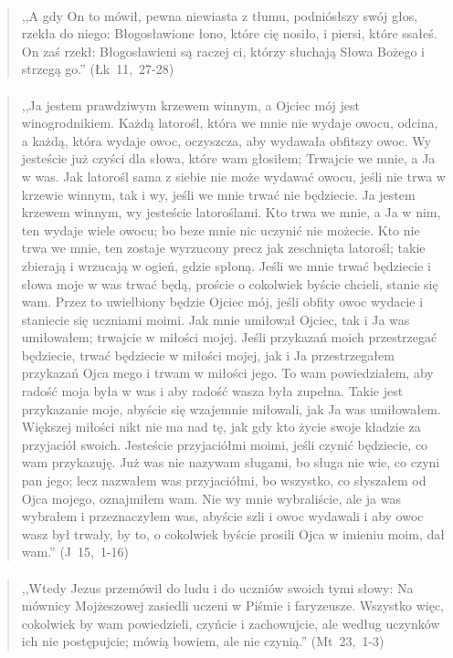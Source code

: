 \documentclass[10pt,a4paper,oneside]{article}
\begin{document}
\paragraph{}
\begin{quote}
,,A gdy On to mówił, pewna niewiasta z tłumu, podniósłszy swój głos, rzekła do niego: Błogosławione łono, które cię nosiło, i piersi, które ssałeś. On zaś rzekł: Błogosławieni są raczej ci, którzy słuchają Słowa Bożego i strzegą go.'' \mbox{(Łk 11, 27-28)}
\end{quote}
\paragraph{}
\begin{quote}
,,Ja jestem prawdziwym krzewem winnym, a Ojciec mój jest winogrodnikiem. Każdą latorośl, która we mnie nie wydaje owocu, odcina, a każdą, która wydaje owoc, oczyszcza, aby wydawała obfitszy owoc. Wy jesteście już czyści dla słowa, które wam głosiłem; Trwajcie we mnie, a Ja w was. Jak latorośl sama z siebie nie może wydawać owocu, jeśli nie trwa w krzewie winnym, tak i wy, jeśli we mnie trwać nie będziecie. Ja jestem krzewem winnym, wy jesteście latoroślami. Kto trwa we mnie, a Ja w nim, ten wydaje wiele owocu; bo beze mnie nic uczynić nie możecie. Kto nie trwa we mnie, ten zostaje wyrzucony precz jak zeschnięta latorośl; takie zbierają i wrzucają w ogień, gdzie spłoną. Jeśli we mnie trwać będziecie i słowa moje w was trwać będą, proście o cokolwiek byście chcieli, stanie się wam. Przez to uwielbiony będzie Ojciec mój, jeśli obfity owoc wydacie i staniecie się uczniami moimi. Jak mnie umiłował Ojciec, tak i Ja was umiłowałem; trwajcie w miłości mojej. Jeśli przykazań moich przestrzegać będziecie, trwać będziecie w miłości mojej, jak i Ja przestrzegałem przykazań Ojca mego i trwam w miłości jego. To wam powiedziałem, aby radość moja była w was i aby radość wasza była zupełna. Takie jest przykazanie moje, abyście się wzajemnie miłowali, jak Ja was umiłowałem. Większej miłości nikt nie ma nad tę, jak gdy kto życie swoje kładzie za przyjaciół swoich. Jesteście przyjaciółmi moimi, jeśli czynić będziecie, co wam przykazuję. Już was nie nazywam sługami, bo sługa nie wie, co czyni pan jego; lecz nazwałem was przyjaciółmi, bo wszystko, co słyszałem od Ojca mojego, oznajmiłem wam. Nie wy mnie wybraliście, ale ja was wybrałem i przeznaczyłem was, abyście szli i owoc wydawali i aby owoc wasz był trwały, by to, o cokolwiek byście prosili Ojca w imieniu moim, dał wam.'' \mbox{(J 15, 1-16)}
\end{quote}
\paragraph{}
\begin{quote}
,,Wtedy Jezus przemówił do ludu i do uczniów swoich tymi słowy: Na mównicy Mojżeszowej zasiedli uczeni w Piśmie i faryzeusze. Wszystko więc, cokolwiek by wam powiedzieli, czyńcie i zachowujcie, ale według uczynków ich nie postępujcie; mówią bowiem, ale nie czynią.'' \mbox{(Mt 23, 1-3)}
\end{quote}
\end{document}

